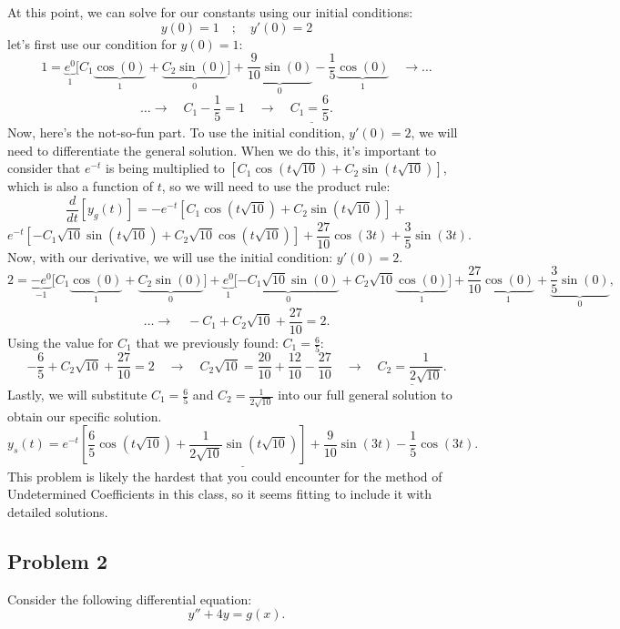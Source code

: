 \documentclass[a4paper,12pt]{article}
\begin{document}
At this point, we can solve for our constants using our initial conditions:
$$ y(0) = 1 \quad ; \quad y'\left(0\right) = 2 $$
let's first use our condition for $y(0) = 1$:
$$ 1 = \underbrace{e^{0}}_1\bigg[C_1\underbrace{\cos(0)}_1 + \underbrace{C_2\sin(0)}_0\bigg] + \underbrace{\frac{9}{10}\sin{(0)}}_0 - \frac{1}{5}\underbrace{\cos{(0)}}_1 \quad\rightarrow \ldots $$
$$ \ldots\rightarrow \quad C_1 -\frac{1}{5} = 1 \quad\rightarrow\quad \underline{C_1 = \frac{6}{5}.}$$
Now, here's the not-so-fun part. To use the initial condition, $y'(0)=2$, we will need to differentiate the general solution. When we do this, it's important to consider that $e^{-t}$ is being multiplied to $\left[C_1\cos{\left(t\sqrt{10}\right)} + C_2\sin{\left(t\sqrt{10}\right)}\right]$, which is also a function of $t$, so we will need to use the product rule:
$$ \frac{d}{dt}[y_g(t)] = -e^{-t}\left[C_1\cos{\left(t\sqrt{10}\right)} + C_2\sin{\left(t\sqrt{10}\right)}\right] +$$
$$e^{-t}\left[-C_1\sqrt{10}\sin{\left(t\sqrt{10}\right)} +C_2\sqrt{10}\cos{\left(t\sqrt{10}\right)}\right] +\frac{27}{10}\cos{(3t)} + \frac{3}{5}\sin{(3t)}. $$
Now, with our derivative, we will use the initial condition: $y'(0) = 2$.
$$ 2 = \underbrace{-e^{0}}_{-1}\bigg[C_1\underbrace{\cos(0)}_1 + \underbrace{C_2\sin(0)}_0\bigg] + \underbrace{e^{0}}_1\bigg[\underbrace{-C_1\sqrt{10}\sin(0)}_0 + C_2\sqrt{10}\underbrace{\cos(0)}_1\bigg] + \frac{27}{10}\underbrace{\cos(0)}_1 + \underbrace{\frac{3}{5}\sin(0)}_0, $$
$$\ldots\rightarrow \quad -C_1 + C_2\sqrt{10} + \frac{27}{10} = 2.$$
Using the value for $C_1$ that we previously found: $C_1 = \frac{6}{5}$:
$$ -\frac{6}{5} + C_2\sqrt{10} +\frac{27}{10} = 2 \quad\rightarrow \quad C_2\sqrt{10} =\frac{20}{10} + \frac{12}{10} - \frac{27}{10} \quad\rightarrow \quad \underline{C_2 = \frac{1}{2\sqrt{10}}.} $$
Lastly, we will substitute $C_1 = \frac{6}{5}$ and $C_2 = \frac{1}{2\sqrt{10}}$ into our full general solution to obtain our specific solution.
$$ \underline{\boxed{y_s(t) = e^{-t}\left[
\frac{6}{5}\cos{\left(t\sqrt{10}\right)} + \frac{1}{2\sqrt{10}}\sin{\left(t\sqrt{10}\right)}\right] +  \frac{9}{10}\sin{(3t)} - \frac{1}{5}\cos{(3t).}}}$$
This problem is likely the hardest that you could encounter for the method of Undetermined Coefficients in this class, so it seems fitting to include it with detailed solutions.

\pagebreak

\subsection*{Problem 2} Consider the following differential equation:
$$ y'' + 4y = g(x). $$
\end{document}

